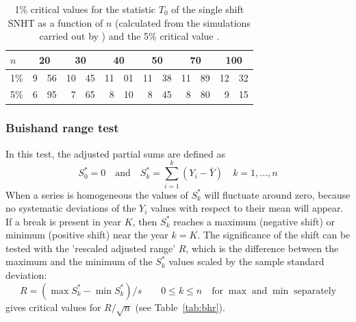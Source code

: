 \documentclass[a4paper,11pt]{article}
\begin{document}
\begin{table}[!ht]
\begin{center}
\caption{1\% critical values for the statistic $T_0$ of the single
shift SNHT as a function of $n$ (calculated from the simulations
carried out by \citet{jaruskova}) and the 5\% critical value
\citep{alexandersson}.}
\label{tab:snh}
\begin{tabular}{l r@{.}l r@{.}l r@{.}l r@{.}l r@{.}l r@{.}l}
\hline
$n$ & \multicolumn{2}{c}{20} & \multicolumn{2}{c}{30} & \multicolumn{2}{c}{40} & \multicolumn{2}{c}{50} & \multicolumn{2}{c}{70} & \multicolumn{2}{c}{100}\\
\hline
1\% & 9&56 & 10&45 & 11&01 & 11&38 & 11&89 & 12&32\\
5\% & 6&95 & 7&65 & 8&10 & 8&45 & 8&80 & 9&15 \\
\hline
\end{tabular}
\end{center}
\end{table}

\subsubsection{Buishand range test}
\label{sec:bhr}

In this test, the adjusted partial sums are defined as
\begin{equation*}
S_0^* = 0 \quad \mathrm{and} \quad S_k^* = \sum_{i=1}^{k}(Y_i -
\bar{Y}) \quad k=1,\ldots,n
\end{equation*}
When a series is homogeneous the values of $S_k^*$ will fluctuate
around zero, because no systematic deviations of the $Y_i$ values with
respect to their mean will appear. If a break is present in year $K$,
then $S_k^*$ reaches a maximum (negative shift) or minimum (positive
shift) near the year $k=K$.  The significance of the shift can be
tested with the 'rescaled adjusted range' $R$, which is the difference
between the maximum and the minimum of the $S_k^*$ values scaled by
the sample standard deviation:
\begin{equation*}
R = ( \max{S_k^*} - \min{S_k^*})/s \qquad 0 \leq k \leq n \quad
\mathrm{for}\;\max\;\mathrm{and}\;\min\;\mathrm{separately}
\end{equation*}
\citet{buishand1982} gives critical values for $R/\sqrt{n}$ (see
Table~\ref{tab:bhr}).
\end{document}
